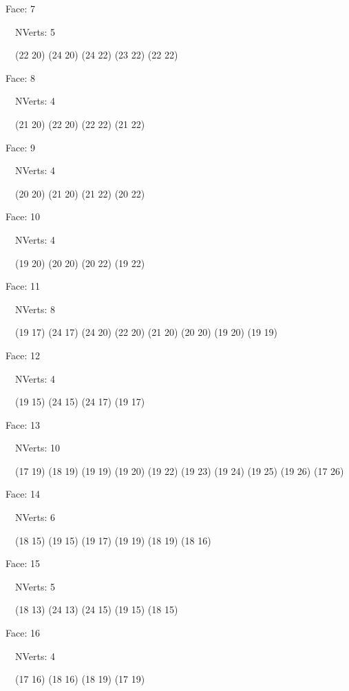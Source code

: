 \documentclass{article}
\begin{document}
{\footnotesize 

Face: 7

\   \    NVerts: 5

 \   \   (22 20) (24 20) (24 22) (23 22) (22 22)}

{\footnotesize 

Face: 8

\   \    NVerts: 4

 \   \   (21 20) (22 20) (22 22) (21 22)}

{\footnotesize 

Face: 9

\   \    NVerts: 4

 \   \   (20 20) (21 20) (21 22) (20 22)}

{\footnotesize 

Face: 10

\   \    NVerts: 4

 \   \   (19 20) (20 20) (20 22) (19 22)}

{\footnotesize 

Face: 11

\   \    NVerts: 8

 \   \   (19 17) (24 17) (24 20) (22 20) (21 20) (20 20) (19 20) (19 19)}

{\footnotesize 

Face: 12

\   \    NVerts: 4

 \   \   (19 15) (24 15) (24 17) (19 17)}

{\footnotesize 

Face: 13

\   \    NVerts: 10

 \   \   (17 19) (18 19) (19 19) (19 20) (19 22) (19 23) (19 24) (19 25) (19 26) (17 26)}

{\footnotesize 

Face: 14

\   \    NVerts: 6

 \   \   (18 15) (19 15) (19 17) (19 19) (18 19) (18 16)}

{\footnotesize 

Face: 15

\   \    NVerts: 5

 \   \   (18 13) (24 13) (24 15) (19 15) (18 15)}

{\footnotesize 

Face: 16

\   \    NVerts: 4

 \   \   (17 16) (18 16) (18 19) (17 19)}
\end{document}
